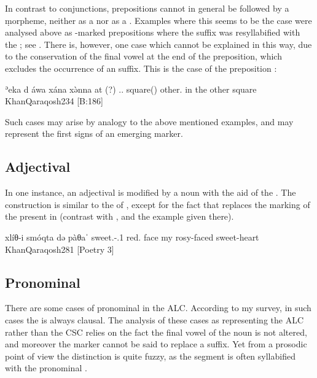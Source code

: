  


In contrast to conjunctions, prepositions cannot in general be followed by a \d morpheme, neither as a \lnk* nor as a \comp*. Examples where this seems to be the case were analysed above as \cst-marked prepositions where the \mbox{} suffix was resyllabified with the \secn; see . There is, however, one case which cannot be explained in this way, due to the conservation of the final  vowel at the end of the preposition, which excludes the occurrence of an \ed suffix. This is the case of the preposition :

{ʾeka\cb{} d\cb{} áwa xána xə̀nna}
{at\cb{} \gen(?)\cb{} \dem.\far.\masc{} square(\fem) other.\masc}
{in the other square}
{KhanQaraqosh}{234 {[B:186]}}
 
Such cases may arise by analogy to the above mentioned examples, and may represent the first signs of an emerging \gen* marker. 



















\subsection{Adjectival \prims}

In one instance, an adjectival \prim is modified by a noun with the aid of the \lnk*. The construction is similar to the  of  , except for the fact that \lnk* replaces the \cst* marking of the \prim present in  (contrast with , and the  example given there).

{xlíθ-i smóqta də\cb{} pàθaˈ}
{sweet.\fem-\poss.1\sg{} red.\fem{} \lnk\cb{} face}
{my rosy-faced sweet-heart}
{KhanQaraqosh}{281 {[Poetry 3]}}\antipar

\subsection{Pronominal \prims}

There are some cases of pronominal \prims in the ALC. According to my survey, in such cases the \secn is always clausal. The analysis of these cases as representing the ALC rather than the CSC relies on the fact the final vowel of the \prim noun is not altered, and moreover the  marker cannot be said to replace a \free* suffix. Yet from a prosodic point of view the distinction is quite fuzzy, as the  segment is often syllabified with the pronominal \prim.

